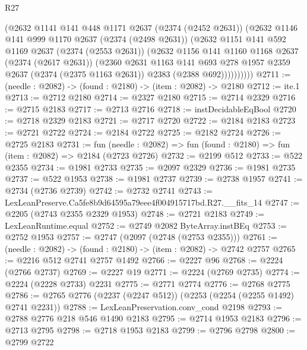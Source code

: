 \begin{lexlean}{R27}
\begin{coremodule}
            (@2632
              @1141
              @141
              @448
              @1171
              @2637
              (@2374 (@2452 @2631))
              (@2632
                @1146
                @141
                @999
                @1170
                @2637
                (@2374 (@2498 @2631))
                (@2632
                  @1151
                  @141
                  @592
                  @1169
                  @2637
                  (@2374 (@2553 @2631))
                  (@2632
                    @1156
                    @141
                    @1160
                    @1168
                    @2637
                    (@2374 (@2617 @2631))
                    (@2360
                      @2631
                      @1163
                      @141
                      @693
                      @278
                      @1957
                      @2359
                      @2637
                      (@2374 (@2375 @1163 @2631))
                      @2383
                      (@2388 @692))))))))))
@2711 := (needle : @2082) -> (found : @2180) -> (item : @2082) -> @2180
@2712 := ite.{1}
@2713 := @2712 @2180
@2714 := @2327 @2180
@2715 := @2714 @2329
@2716 := @2715 @2183
@2717 := @2713 @2716
@2718 := instDecidableEqBool
@2720 := @2718 @2329 @2183
@2721 := @2717 @2720
@2722 := @2184 @2183
@2723 := @2721 @2722
@2724 := @2184 @2722
@2725 := @2182 @2724
@2726 := @2725 @2183
@2731 := fun (needle : @2082) => fun (found : @2180) => fun (item : @2082) => @2184 (@2723 @2726)
@2732 := @2199 @512
@2733 := @522 @2355
@2734 := @1981 @2733
@2735 := @2097 @2329
@2736 := @1981 @2735
@2737 := @522 @1953
@2738 := @1981 @2737
@2739 := @2738 @1957
@2741 := @2734 (@2736 @2739)
@2742 := @2732 @2741
@2743 := LexLeanPreserve.Ca5fe8b9d64595a79eee4f004915717bd.R27.__fits_14
@2747 := @2205 (@2743 @2355 @2329 @1953)
@2748 := @2721 @2183
@2749 := LexLeanRuntime.equal
@2752 := @2749 @2082 ByteArray.instBEq
@2753 := @2752 @1953
@2757 := @2747 (@2097 (@2748 (@2753 @2355)))
@2761 := (needle : @2082) -> (found : @2180) -> (item : @2082) -> @2742 @2757
@2765 := @2216 @512 @2741 @2757 @1492
@2766 := @2227 @96
@2768 := @2224 (@2766 @2737)
@2769 := @2227 @19
@2771 := @2224 (@2769 @2735)
@2774 := @2224 (@2228 @2733) @2231
@2775 := @2771 @2774
@2776 := @2768 @2775
@2786 := @2765 @2776 (@2237 (@2247 @512)) (@2253 (@2254 (@2255 @1492) @2741 @2231))
@2788 := LexLeanPreservation.conv_cond @2198
@2793 := @2788 @2776 @218 @546 @1490 @2183
@2795 := @2714 @1953 @2183
@2796 := @2713 @2795
@2798 := @2718 @1953 @2183
@2799 := @2796 @2798
@2800 := @2799 @2722

\end{coremodule}
\end{lexlean}
